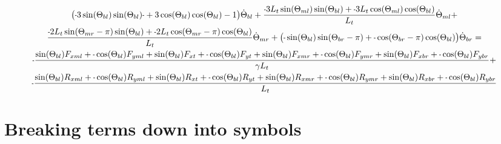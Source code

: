 \documentclass[11pt, landscape]{article}
\newcommand{\mn}{\scalebox{0.7}[1.0]{-}}
\begin{document}
\begin{multline}
\big(\mn 3\sin(\Theta_{bl})\sin(\Theta_{bl})\mn + 3\cos(\Theta_{bl})\cos(\Theta_{bl}) -1\big)\dot{\Theta}_{bl} +
\frac{\mn 3L_{t}\sin(\Theta_{ml})\sin(\Theta_{bl}) + \mn 3L_{t}\cos(\Theta_{ml})\cos(\Theta_{bl})}{L_t}\dot{\Theta}_{ml} + \\
\frac{\mn 2L_{t}\sin(\Theta_{mr}-\pi)\sin(\Theta_{bl}) + \mn 2L_{t}\cos(\Theta_{mr}-\pi)\cos(\Theta_{bl})}{L_t}\dot{\Theta}_{mr} +
\big(\mn \sin(\Theta_{bl}) \sin(\Theta_{br}-\pi) + \mn \cos(\Theta_{br}-\pi)\cos(\Theta_{bl})\big) \dot{\Theta}_{br} = \\
\mn \frac{\sin(\Theta_{bl})F_{xml} + \mn\cos(\Theta_{bl})F_{yml} + \sin(\Theta_{bl})F_{xt } + \mn \cos(\Theta_{bl})F_{yt } + \sin(\Theta_{bl})F_{xmr} + \mn \cos(\Theta_{bl})F_{ymr} + \sin(\Theta_{bl})F_{xbr} + \mn \cos(\Theta_{bl})F_{ybr}}{\gamma L_t} + \\
\mn \frac{\sin(\Theta_{bl})R_{xml} + \mn \cos(\Theta_{bl})R_{yml} + \sin(\Theta_{bl})R_{xt } + \mn \cos(\Theta_{bl})R_{yt} + \sin(\Theta_{bl})R_{xmr} + \mn \cos(\Theta_{bl})R_{ymr} + \sin(\Theta_{bl})R_{xbr} + \mn \cos(\Theta_{bl})R_{ybr}}{L_t}
\end{multline}

\section{Breaking terms down into symbols}
\end{document}
